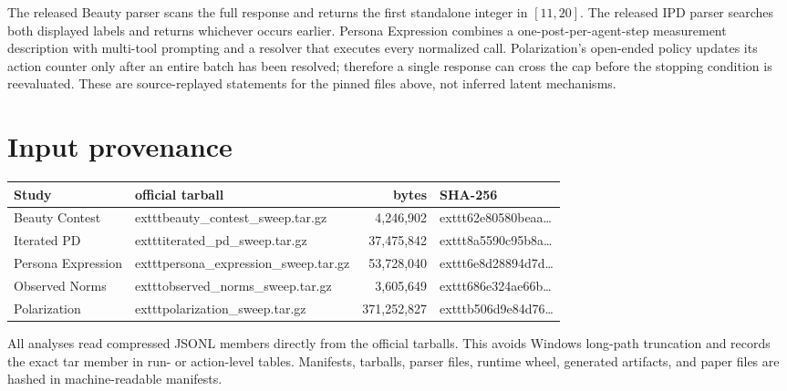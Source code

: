 \documentclass[10pt]{article}
\begin{document}
The released Beauty parser scans the full response and returns the first standalone integer in $[11,20]$. The released IPD parser searches both displayed labels and returns whichever occurs earlier. Persona Expression combines a one-post-per-agent-step measurement description with multi-tool prompting and a resolver that executes every normalized call. Polarization's open-ended policy updates its action counter only after an entire batch has been resolved; therefore a single response can cross the cap before the stopping condition is reevaluated. These are source-replayed statements for the pinned files above, not inferred latent mechanisms.

\section{Input provenance}
\small
\begin{tabular}{@{}lp{5.5cm}rp{3.5cm}@{}}
\toprule
Study & official tarball & bytes & SHA-256 \\
\midrule
Beauty Contest & 	exttt{beauty\_contest\_sweep.tar.gz} & 4,246,902 & 	exttt{62e80580beaa\ldots} \\
Iterated PD & 	exttt{iterated\_pd\_sweep.tar.gz} & 37,475,842 & 	exttt{8a5590c95b8a\ldots} \\
Persona Expression & 	exttt{persona\_expression\_sweep.tar.gz} & 53,728,040 & 	exttt{6e8d28894d7d\ldots} \\
Observed Norms & 	exttt{observed\_norms\_sweep.tar.gz} & 3,605,649 & 	exttt{686e324ae66b\ldots} \\
Polarization & 	exttt{polarization\_sweep.tar.gz} & 371,252,827 & 	exttt{b506d9e84d76\ldots} \\
\bottomrule
\end{tabular}

All analyses read compressed JSONL members directly from the official tarballs. This avoids Windows long-path truncation and records the exact tar member in run- or action-level tables. Manifests, tarballs, parser files, runtime wheel, generated artifacts, and paper files are hashed in machine-readable manifests.
\end{document}
